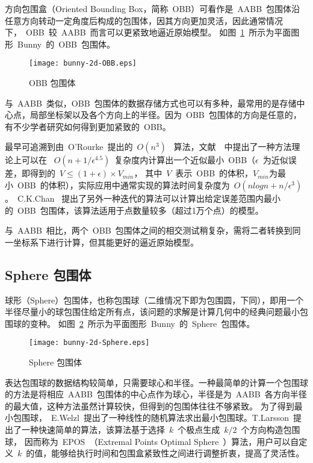 方向包围盒（Oriented Bounding Box，简称~OBB）可看作是~AABB~包围体沿任意方向转动一定角度后构成的包围体，因其方向更加灵活，因此通常情况下，~OBB~较~AABB~而言可以更紧致地逼近原始模型。
如图~\ref{fig:obb-bunny}~所示为平面图形~Bunny~的~OBB~包围体。
\begin{figure}[H] %
  \centering
  \texttt{[image: bunny-2d-OBB.eps]}
  \caption{OBB 包围体}
  \label{fig:obb-bunny}
\end{figure}
与~AABB~类似，OBB~包围体的数据存储方式也可以有多种，最常用的是存储中心点，局部坐标架以及各个方向上的半径\cite{gottschalk1996obbtree}。因为~OBB~包围体的方向是任意的，有不少学者研究如何得到更加紧致的~OBB。

最早可追溯到由~O'Rourke~\cite{o1985finding}提出的~$O(n^3)$~
算法，文献~~中提出了一种方法理论上可以在~
$O(n+1/\epsilon^{4.5})$~复杂度内计算出一个近似最小~OBB（$\epsilon$~为近似误差，即得到的~$V\leq(1+\epsilon)\times V_{min}$，
其中~$V$~表示~OBB~的体积，$V_{min}$为最小~OBB~的体积），实际应用中通常实现的算法时间复杂度为~$O(nlogn+n/
\epsilon ^{3})$。~C.K.Chan~ \cite{chan2001determination}
提出了另外一种迭代的算法可以计算出给定误差范围内最小的~OBB~包围体，该算法适用于点数量较多（超过1万个点）的模型。

与~AABB~相比，两个~OBB~包围体之间的相交测试稍复杂，需将二者转换到同一坐标系下进行计算，但其能更好的逼近原始模型。

\subsection{Sphere 包围体}

球形（Sphere）包围体，也称包围球（二维情况下即为包围圆，下同），即用一个半径尽量小的球包围住给定所有点，该问题的求解是计算几何中的经典问题最小包围球的变种。
如图~\ref{fig:sphere-bunny}~所示为平面图形~Bunny~的~Sphere~包围体。
\begin{figure}[H] %
  \centering
  \texttt{[image: bunny-2d-Sphere.eps]}
  \caption{Sphere 包围体}
  \label{fig:sphere-bunny}
\end{figure}
表达包围球的数据结构较简单，只需要球心和半径。一种最简单的计算一个包围球的方法是将相应~AABB~包围体的中心点作为球心，半径是为~AABB~各方向半径的最大值，这种方法虽然计算较快，但得到的包围体往往不够紧致。
为了得到最小包围球，~E.Welzl~\cite{Welzl1991Smallest}提出了一种线性的随机算法求出最小包围球。T.Larsson~\cite{larsson2008fast}提出了一种快速简单的算法，该算法基于选择~$k$~个极点生成~$k/2$~个方向构造包围球，
因而称为~EPOS~（Extremal Points Optimal Sphere~）算法，用户可以自定义~$k$~的值，能够给执行时间和包围盒紧致性之间进行调整折衷，提高了灵活性。

